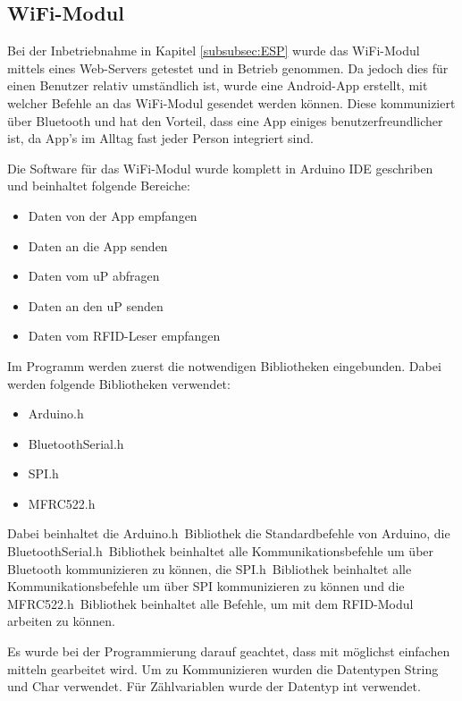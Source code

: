 \subsection{WiFi-Modul}
\label{subsec:Software_ESP32}

Bei der Inbetriebnahme in Kapitel \ref{subsubsec:ESP} wurde das WiFi-Modul mittels eines Web-Servers getestet und in Betrieb genommen. Da jedoch dies für einen Benutzer relativ umständlich ist, wurde eine Android-App erstellt, mit welcher Befehle an das WiFi-Modul gesendet werden können. Diese kommuniziert über Bluetooth und hat den Vorteil, dass eine App einiges benutzerfreundlicher ist, da App's im Alltag fast jeder Person integriert sind. \cite{santos_esp32_2018}  

Die Software für das WiFi-Modul wurde komplett in Arduino IDE geschriben und beinhaltet folgende Bereiche:

\begin{itemize}
\item Daten von der App empfangen
\item Daten an die App senden
\item Daten vom uP abfragen
\item Daten an den uP senden 
\item Daten vom RFID-Leser empfangen
\end{itemize}

Im Programm werden zuerst die notwendigen Bibliotheken  eingebunden. Dabei werden folgende Bibliotheken verwendet:

\begin{itemize}
\item Arduino.h
\item BluetoothSerial.h
\item SPI.h
\item MFRC522.h
\end{itemize}

Dabei beinhaltet die \flqq Arduino.h\frqq~Bibliothek die Standardbefehle von Arduino, die \flqq BluetoothSerial.h\frqq~Bibliothek beinhaltet alle Kommunikationsbefehle um über Bluetooth kommunizieren zu können, die \flqq SPI.h\frqq~Bibliothek beinhaltet alle Kommunikationsbefehle um über SPI kommunizieren zu können und die \flqq MFRC522.h\frqq~Bibliothek beinhaltet alle Befehle, um mit dem RFID-Modul arbeiten zu können.

Es wurde bei der Programmierung darauf geachtet, dass mit möglichst einfachen mitteln gearbeitet wird. Um zu Kommunizieren wurden die Datentypen String und Char verwendet. Für Zählvariablen wurde der Datentyp int verwendet. 